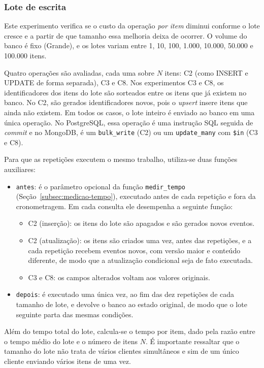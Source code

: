\subsubsection{Lote de escrita}

Este experimento verifica se o custo da operação \textit{por item} diminui conforme o lote
cresce e a partir de que tamanho essa melhoria deixa de ocorrer. O volume do
banco é fixo (Grande), e os lotes variam entre 1, 10, 100, 1.000, 10.000, 50.000 e 100.000 itens.

Quatro operações são avaliadas, cada uma sobre $N$ itens: C2 (como INSERT e UPDATE de forma separada), C3 e C8. Nos experimentos C3 e C8, os identificadores dos itens do lote são sorteados
entre os itens que já existem no banco. No C2, são gerados identificadores novos,
pois o \textit{upsert} insere itens que ainda não existem. Em todos os casos, o
lote inteiro é enviado ao banco em uma única operação. No PostgreSQL, essa
operação é uma instrução SQL seguida de \textit{commit} e no MongoDB, é um
\texttt{bulk\_write} (C2) ou um \texttt{update\_many} com \texttt{\$in} (C3 e C8).

Para que as repetições executem o mesmo trabalho,
utiliza-se duas funções auxiliares:

\begin{itemize}
  \item \texttt{antes}: é o parâmetro opcional da função \texttt{medir\_tempo}
  (Seção~\ref{subsec:medicao-tempo}), executado antes de cada repetição e fora
  da cronometragem. Em cada consulta ele desempenha a seguinte função:
  \begin{itemize}
    \item C2 (inserção): os itens do lote são apagados e são gerados novos eventos.
    \item C2 (atualização): os itens são criados uma vez, antes das repetições, e a cada 
    repetição recebem eventos novos, com versão maior e conteúdo diferente, de modo que 
    a atualização condicional seja de fato executada.
    \item C3 e C8: os campos alterados voltam aos valores originais.
  \end{itemize}
  \item \texttt{depois}: é executado uma única vez, ao fim das dez repetições de
  cada tamanho de lote, e devolve o banco ao estado original, de modo que o
  lote seguinte parta das mesmas condições.
\end{itemize}

Além do tempo total do lote, calcula-se o tempo por item, dado pela razão entre o
tempo médio do lote e o número de itens $N$. É importante ressaltar que o tamanho do lote não trata
de vários clientes simultâneos e sim de um único cliente enviando vários itens de uma vez.

